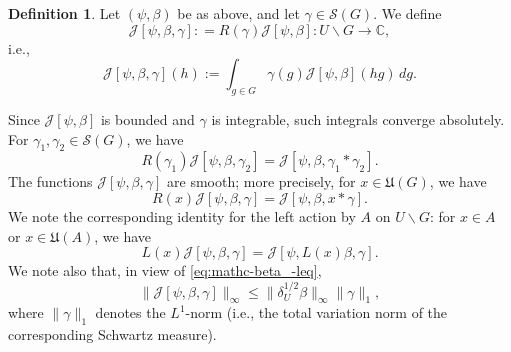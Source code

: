 \documentclass[reqno]{amsart}
\theoremstyle{plain} \newtheorem{theorem} {Theorem}
\theoremstyle{definition} \newtheorem{definition} [theorem] {Definition}
\theoremstyle{itplain} %
\numberwithin{equation}{section}
\numberwithin{theorem}{section}
\renewcommand{\leq}{\leqslant}
\begin{document}
\begin{definition}
  Let $(\psi,\beta)$ be as above, and let $\gamma \in \mathcal{S}(G)$.  We define  
  \begin{equation*}
    \mathcal{J}[\psi,\beta,\gamma] : = R(\gamma) \mathcal{J}[\psi,\beta] : U \backslash G \rightarrow \mathbb{C},
  \end{equation*}
  i.e.,
\begin{equation*}
  \mathcal{J}[\psi,\beta,\gamma](h) :=
  \int _{g \in G}
  \gamma(g) \mathcal{J}[\psi,\beta](h g) \, d g.
\end{equation*}
\end{definition}
Since $\mathcal{J}[\psi,\beta]$ is bounded and $\gamma$ is integrable, such integrals converge absolutely.  For $\gamma_1, \gamma_2 \in \mathcal{S}(G)$, we have
\begin{equation}\label{eq:rgamm-mathc-beta}
  R(\gamma_1) \mathcal{J}[\psi,\beta,\gamma_2]
  = \mathcal{J}[\psi,\beta,\gamma_1 \ast \gamma_2].
\end{equation}
The functions $\mathcal{J}[\psi,\beta,\gamma]$ are smooth; more precisely, for $x \in \mathfrak{U}(G)$, we have
\begin{equation}\label{eq:rx-mathcald_psi-beta}
R(x) \mathcal{J}[\psi,\beta,\gamma] = \mathcal{J}[\psi,\beta,x \ast  \gamma].
\end{equation}
We note the corresponding identity for the left action by $A$ on $U \backslash G$: for $x \in A$ or $x \in \mathfrak{U}(A)$, we have
\begin{equation}\label{eq:lx-mathcald_psi-beta}
  L(x) \mathcal{J}[\psi,\beta,\gamma] = \mathcal{J}[\psi,L(x) \beta, \gamma].
\end{equation}
We note also that, in view of \eqref{eq:mathc-beta_-leq},
\begin{equation}\label{eq:mathc-beta-gamm}
  \|\mathcal{J}[\psi,\beta,\gamma]\|_{\infty} \leq
  \|\delta_U^{1/2} \beta \|_{\infty} \|\gamma \|_{1},
\end{equation}
where $\|\gamma \|_1$ denotes the $L^1$-norm (i.e., the total variation norm of the corresponding Schwartz measure).
\end{document}
